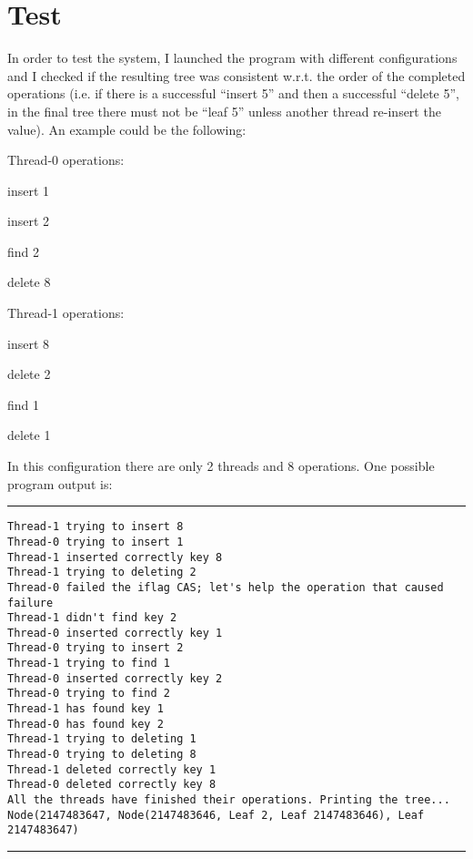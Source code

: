 \documentclass[a4paper]{article}
\begin{document}

\section{Test}
\label{sec:test}
In order to test the system, I launched the program with different configurations and I checked if the resulting tree was consistent w.r.t. the order of the completed operations (i.e. if there is a successful ``insert 5'' and then a successful ``delete 5'', in the final tree there must not be ``leaf 5'' unless another thread re-insert the value). An example could be the following:
\begin{compactitem}
  \item Thread-0 operations: 
    \begin{compactitem}
      \item insert 1
      \item insert 2
      \item find 2
      \item delete 8
    \end{compactitem}
  \item Thread-1 operations:
    \begin{compactitem}
      \item insert 8
      \item delete 2
      \item find 1
      \item delete 1
    \end{compactitem}
\end{compactitem}

In this configuration there are only 2 threads and 8 operations. One possible program output is:
\noindent\rule{\textwidth}{1pt}
\begin{verbatim}
Thread-1 trying to insert 8
Thread-0 trying to insert 1
Thread-1 inserted correctly key 8
Thread-1 trying to deleting 2
Thread-0 failed the iflag CAS; let's help the operation that caused failure
Thread-1 didn't find key 2
Thread-0 inserted correctly key 1
Thread-0 trying to insert 2
Thread-1 trying to find 1
Thread-0 inserted correctly key 2
Thread-0 trying to find 2
Thread-1 has found key 1
Thread-0 has found key 2
Thread-1 trying to deleting 1
Thread-0 trying to deleting 8
Thread-1 deleted correctly key 1
Thread-0 deleted correctly key 8
All the threads have finished their operations. Printing the tree...
Node(2147483647, Node(2147483646, Leaf 2, Leaf 2147483646), Leaf 2147483647)
\end{verbatim}
\noindent\rule{\textwidth}{1pt}
\end{document}
